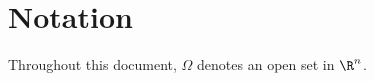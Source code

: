 \documentclass[../main.tex]{subfiles}
\begin{document}
\section{Notation}
Throughout this document, $ \Omega $ denotes an open set in $ \R^n $.
\end{document}
